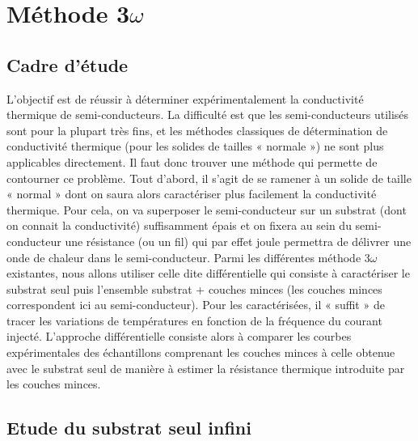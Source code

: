 \documentclass[10pt,a4paper]{report}
\begin{document}
\chapter{Méthode 3$\omega$}
\section{Cadre d'étude}
L’objectif est de réussir à déterminer expérimentalement la conductivité thermique de semi-conducteurs. La difficulté est que les semi-conducteurs utilisés sont pour la plupart très fins, et les méthodes classiques de détermination de conductivité thermique (pour les solides de tailles « normale ») ne sont plus applicables directement. Il faut donc trouver une méthode qui permette de contourner ce problème. Tout d’abord, il s’agit de se ramener à un solide de taille « normal » dont on saura alors caractériser plus facilement la conductivité thermique. Pour cela, on va superposer le semi-conducteur sur un substrat (dont on connait la conductivité) suffisamment épais et on fixera au sein du semi-conducteur une résistance (ou un fil) qui par effet joule permettra de délivrer une onde de chaleur dans le semi-conducteur. Parmi les différentes méthode 3$\omega$ existantes, nous allons utiliser celle dite différentielle qui consiste à caractériser le substrat seul puis l’ensemble substrat + couches minces (les couches minces correspondent ici au semi-conducteur). Pour les caractérisées, il « suffit » de tracer les variations de températures en fonction de la fréquence du courant injecté. L'approche différentielle consiste alors à comparer les courbes expérimentales des échantillons comprenant les couches minces à celle obtenue avec le substrat seul de manière à estimer la résistance thermique introduite par les couches minces.
\section{Etude du substrat seul infini}
\end{document}
